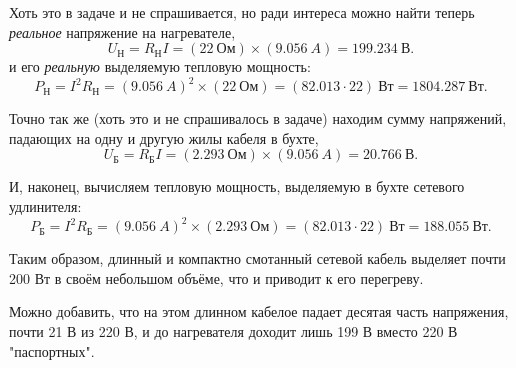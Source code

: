 \documentclass[letterpaper,twoside,12pt]{article}
\begin{document}
Хоть это в задаче и не спрашивается, но ради интереса можно найти теперь \emph{реальное} напряжение на нагревателе,
\begin{equation}
  \label{г_nagr}
  U_\text{Н} = R_\text{Н} I = (22~\text{Ом}) \times (9.056~A) = 199.234~\text{В}.
\end{equation}
и его \emph{реальную} выделяемую тепловую мощность:
\begin{equation}
  \label{p_nagr}
  P_\text{Н} = I^2 R_\text{Н} = (9.056~A)^2 \times (22~\text{Ом}) = (82.013 \cdot 22)~\text{Вт} = 1804.287~\text{Вт}.
\end{equation}

Точно так же (хоть это и не спрашивалось в задаче) находим сумму напряжений, падающих на одну и другую жилы кабеля в бухте,
\begin{equation}
  \label{u_buh}
  U_\text{Б} = R_\text{Б} I = (2.293~\text{Ом}) \times (9.056~A) = 20.766~\text{В}.
\end{equation}

И, наконец, вычисляем тепловую мощность, выделяемую  в бухте сетевого удлинителя:
\begin{equation}
  \label{p_buh}
  P_\text{Б} = I^2 R_\text{Б} = (9.056~A)^2 \times (2.293~\text{Ом}) = (82.013 \cdot 22)~\text{Вт} = 188.055~\text{Вт}. 
\end{equation}

Таким образом, длинный и компактно смотанный сетевой кабель выделяет почти 200 Вт в своём небольшом объёме, что и приводит к его перегреву.

Можно добавить, что на этом длинном кабелое падает десятая часть напряжения, почти 21 В из 220 В, и до нагревателя доходит лишь 199 В вместо 220 В "паспортных".
\end{document}

